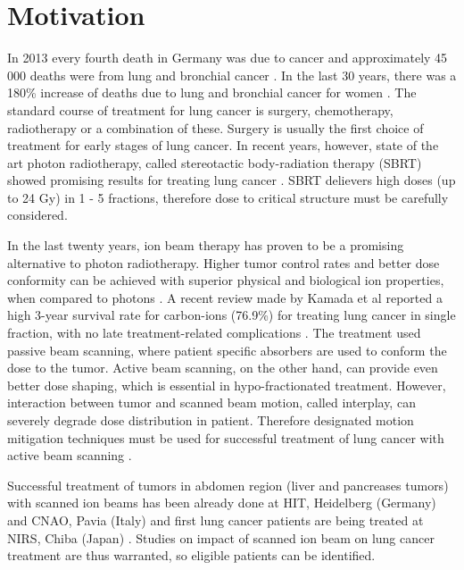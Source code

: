 \documentclass[type=dr, dr=rernat, accentcolor=tud7b,colorbacktitle, bigchapter, openright, twoside, 12pt ]{tudthesis}
\begin{document}
 



\section*{Motivation}
In 2013 every fourth death in Germany was due to cancer and approximately 45 000 deaths were from lung and bronchial cancer \cite{Destatis2015}. In the last 30 years, there was a 180\% increase of deaths due to lung and bronchial cancer for women \cite{Destatis2015}.
The standard course of treatment for lung cancer is surgery, chemotherapy, radiotherapy or a combination of these. Surgery is usually the first choice of treatment for early stages of lung cancer. 
In recent years, however, state of the art photon radiotherapy, called stereotactic body-radiation therapy (SBRT) showed
promising results for treating lung cancer \cite{Baumann2009, Greco2011}. SBRT delievers high doses (up to 24 Gy) in 1 - 5 fractions, therefore dose to critical structure must be carefully considered.

In the last twenty years, ion beam therapy has proven to be a promising alternative to photon radiotherapy. Higher tumor control rates and better dose conformity can be achieved with superior physical and biological ion properties, when compared to photons \cite{Tsujii2008,Durante2010}.
A recent review made by Kamada et al reported a high 3-year survival rate for carbon-ions (76.9\%) for treating lung cancer in single fraction, with no late treatment-related complications \cite{Kamada2016}. 
The treatment used passive beam scanning, where patient specific absorbers are used to conform the dose to the tumor. Active beam scanning, on the other hand, can provide even better dose shaping, which is essential in hypo-fractionated treatment. 
However, interaction between tumor and scanned beam motion, called interplay, can severely degrade dose distribution in patient. Therefore designated motion mitigation techniques must be used for successful treatment of lung cancer with active beam scanning \cite{Bert2008}.

Successful treatment of tumors in abdomen region (liver and pancreases tumors) with scanned ion beams has been already done at HIT, Heidelberg (Germany) and CNAO, Pavia (Italy) \cite{Habermehl2013, Rossi2016} and first lung cancer patients are being treated at NIRS, Chiba (Japan) \cite{Mori2016}.
Studies on impact of scanned ion beam on lung cancer treatment are thus warranted, so eligible patients can be identified.
\end{document}
